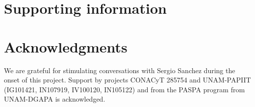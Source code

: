 \documentclass[10pt,letterpaper]{article} %
\begin{document}
\section*{Supporting information} %
\section*{Acknowledgments} %

\nolinenumbers
We are grateful for stimulating conversations with Sergio Sanchez during the onset of this project.  Support by projects CONACyT 285754 and UNAM-PAPIIT (IG101421, IN107919, IV100120, IN105122) and from the PASPA program from UNAM-DGAPA is acknowledged. 
 
\end{document}
